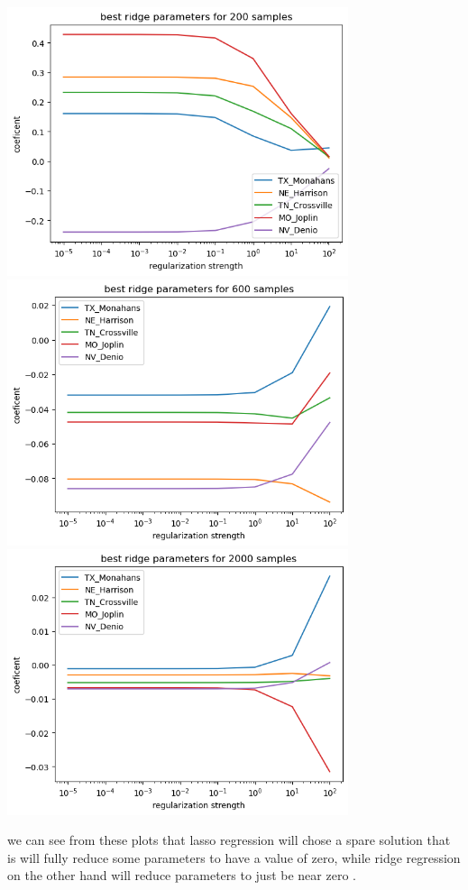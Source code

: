 \documentclass[12pt,twoside]{article}
\begin{document}
\begin{enumerate}
\begin{enumerate}
\begin{itemize}
\begin{itemize}
        \\ \includegraphics[width=10cm]{homework/homework_12/immages/hw_12_9.png}
            \\ \includegraphics[width=10cm]{homework/homework_12/immages/hw_12_10.png}
        \\ \includegraphics[width=10cm]{homework/homework_12/immages/hw_12_11.png}
\end{itemize}
\ITEM we can see from these plots that lasso regression will chose a spare solution that is will fully reduce some parameters to have a value of zero, while ridge regression on the other hand will reduce parameters to just be near zero .
 \end{itemize}
\end{enumerate}

\end{enumerate}
 
\end{document}
